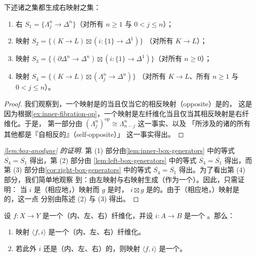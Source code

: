 \begin{corollary}\label{cor:right-box-generators}
下述诸\trMorphism{}之集都生成右\trAnodyne{}映射之集：
\begin{enumerate}[label=(\arabic*)]
  \item 右\trHornInclusion{} $S_1 = \{\Lambda^n_j \to \Delta^n\}$（对所有
  $n \ge 1$ 与 $0 < j \le n$）；
  \item 映射 $S_2 = \{(K \to L) \boxtimes (i\colon \{1\} \to \Delta^1)\}$
  （对所有\trMonomorphism{} $K \to L$）；
  \item 映射 $S_3 = \{(\partial\Delta^n \to \Delta^n) \boxtimes (i\colon \{1\} \to \Delta^1)\}$（对所有 $n \ge 0$）；
  \item 映射 $S_4 = \{(K \to L) \boxtimes (\Lambda^n_j \to \Delta^n)\}$
  （对所有\trMonomorphism{} $K \to L$、所有 $n \ge 1$ 与 $0 < j \le n$）。
\end{enumerate}
\end{corollary}

\begin{proof}
我们观察到，一个映射是\trRightAnodyne{}的当且仅当它的相反映射（opposite）是\trLeftAnodyne{}的，
这是因为根据\cref{ex:inner-fibration-op}，一个映射是左纤维化当且仅当其相反映射是右纤维化。于是，
第一部分由 $(\Lambda^n_j)^{\mathrm{op}} \cong \Lambda^n_{n-j}$ 这一事实、以及
「所涉及的诸\trSimplicialSet{}的所有其他\trMorphism{}都是『自相反的』（self-opposite）」
这一事实得出。
\end{proof}

\begin{proof}[\cref{lem:box-anodyne} 的证明]
第 (1) 部分由\cref{lem:inner-box-generators} 中的等式
$\overline{S_4} = \overline{S_1}$ 得出，第 (2) 部分由%
\cref{lem:left-box-generators} 中的等式 $\overline{S_4} = \overline{S_1}$
得出，而第 (3) 部分由\cref{cor:right-box-generators} 中的等式
$\overline{S_4} = \overline{S_1}$ 得出。为了看出第 (4) 部分，我们简单地观察
到：\trAnodyneMap{}由左\trAnodyne{}映射与右\trAnodyne{}映射生成（作为一个\trSaturatedSet{}）。因此，只需证明：
当 $i$ 是\trLeftAnodyne{}（相应地，\trRightAnodyne{}）映射而 $g$ 是\trMonomorphism{}时，
$i \boxtimes g$ 是\trAnodyne{}的。由于\trLeftAnodyne{}（相应地，\trRightAnodyne{}）映射是\trAnodyne{}的，这一点
分别由陈述 (2) 与 (3) 得出。
\end{proof}

\begin{theorem}\label{thm:angle-fi-fibration}
设 $f\colon X \to Y$ 是一个（内、左、右）纤维化，并设 $i\colon A \to B$ 是一个%
\trMonomorphism{}。那么：
\begin{enumerate}[label=(\arabic*)]
  \item 映射 $\langle f, i \rangle$ 是一个（内、左、右）纤维化。
  \item 若此外 $i$ 还是（内、左、右）\trAnodyne{}的，则映射
  $\langle f, i \rangle$ 是一个\trTrivialFibration{}。
\end{enumerate}
\end{theorem}

